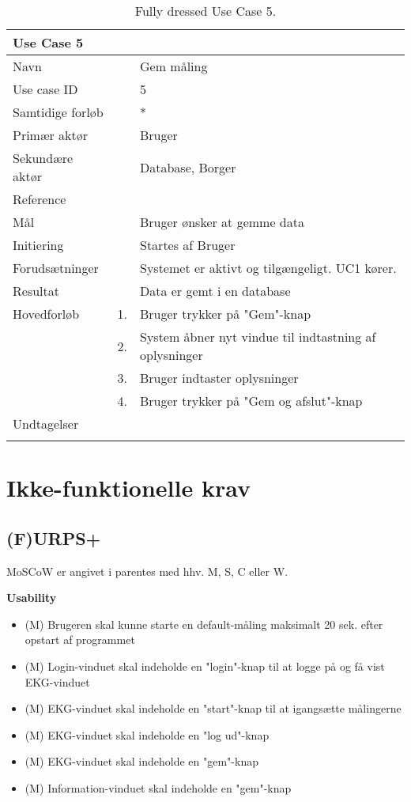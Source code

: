 \begin{longtabu} to  %
    {\large \textbf{Use Case 5}} && \\
    \toprule
    Navn &&    Gem måling\\
    Use case ID &&    5\\
    Samtidige forløb &&   *\\
    Primær aktør &&    Bruger\\
    Sekundære aktør &&	Database, Borger \\
    Reference &&      \\
    Mål &&    Bruger ønsker at gemme data\\
    Initiering &&	Startes af Bruger\\
    Forudsætninger &&  Systemet er aktivt og tilgængeligt. UC1 kører.  \\
    Resultat &&		Data er gemt i en database                 \\ \midrule
    Hovedforløb &    1. &    Bruger trykker på "Gem"\--knap \\[-1ex]   						 	
                &    2. &    System åbner nyt vindue til indtastning af oplysninger\\[-1ex]
                &    3.	&	 Bruger indtaster oplysninger\\[-1ex]
                &	 4. &    Bruger trykker på "Gem og afslut"\--knap  \newline\\ \midrule
                
    Undtagelser &     &      \\ \bottomrule
\caption{Fully dressed Use Case 5.}
\label{UC5}
\end{longtabu}


\section{Ikke-funktionelle krav}


\subsection{(F)URPS+}
MoSCoW er angivet i parentes med hhv. M, S, C eller W.

\textbf{Usability}
\begin{itemize}
	\item (M) Brugeren skal kunne starte en default-måling maksimalt 20 sek. efter opstart af programmet
	\item (M) Login-vinduet skal indeholde en "login"\--knap til at logge på og få vist EKG-vinduet
	\item (M) EKG-vinduet skal indeholde en "start"\--knap til at igangsætte målingerne
	\item (M) EKG-vinduet skal indeholde en "log ud"\--knap
	\item (M) EKG-vinduet  skal indeholde en "gem"\--knap
	\item (M) Information-vinduet skal indeholde en "gem"\--knap
\end{itemize}

